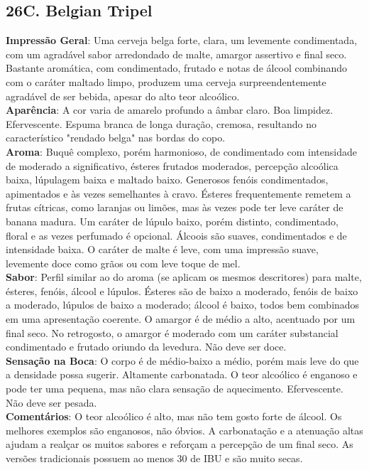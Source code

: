 \subsection*{26C. Belgian Tripel}
\textbf{Impressão Geral}: Uma cerveja belga forte, clara, um levemente condimentada, com um agradável sabor arredondado de malte, amargor assertivo e final seco. Bastante aromática, com condimentado, frutado e notas de álcool combinando com o caráter maltado limpo, produzem uma cerveja surpreendentemente agradável de ser bebida, apesar do alto teor alcoólico. \\
\textbf{Aparência}: A cor varia de amarelo profundo a âmbar claro. Boa limpidez. Efervescente. Espuma branca de longa duração, cremosa, resultando no característico "rendado belga" nas bordas do copo. \\
\textbf{Aroma}: Buquê complexo, porém harmonioso, de condimentado com intensidade de moderado a significativo, ésteres frutados moderados, percepção alcoólica baixa, lúpulagem baixa e maltado baixo. Generosos fenóis condimentados, apimentados e às vezes semelhantes à cravo. Ésteres frequentemente remetem a frutas cítricas, como laranjas ou limões, mas às vezes pode ter leve caráter de banana madura. Um caráter de lúpulo baixo, porém distinto, condimentado, floral e as vezes perfumado é opcional. Álcoois são suaves, condimentados e de intensidade baixa. O caráter de malte é leve, com uma impressão suave, levemente doce como grãos ou com leve toque de mel. \\
\textbf{Sabor}: Perfil similar ao do aroma (se aplicam os mesmos descritores) para malte, ésteres, fenóis, álcool e lúpulos. Ésteres são de baixo a moderado, fenóis de baixo a moderado, lúpulos de baixo a moderado; álcool é baixo, todos bem combinados em uma apresentação coerente. O amargor é de médio a alto, acentuado por um final seco. No retrogosto, o amargor é moderado com um caráter substancial condimentado e frutado oriundo da levedura. Não deve ser doce. \\
\textbf{Sensação na Boca}: O corpo é de médio-baixo a médio, porém mais leve do que a densidade possa sugerir. Altamente carbonatada. O teor alcoólico é enganoso e pode ter uma pequena, mas não clara sensação de aquecimento. Efervescente. Não deve ser pesada. \\
\textbf{Comentários}: O teor alcoólico é alto, mas não tem gosto forte de álcool. Os melhores exemplos são enganosos, não óbvios. A carbonatação e a atenuação altas ajudam a realçar os muitos sabores e reforçam a percepção de um final seco. As versões tradicionais possuem ao menos 30 de IBU e são muito secas. \\
